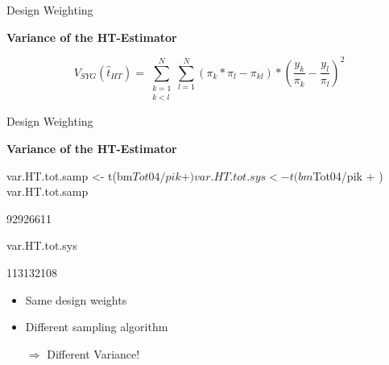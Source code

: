\documentclass[11pt,german,hideothersubsections]{beamer}
\begin{document}
\begin{frame}[fragile]{Design Weighting}
\footnotesize{
\begin{center}
\textbf{Variance of the HT-Estimator}
\end{center}
\begin{equation*}
V_{SYG}(\hat{t}_{HT})=\sum_{\substack{k=1\\ k<l}}^N\sum_{l=1}^N (\pi_k*\pi_l-\pi_{kl})*(\frac{y_k}{\pi_k}-\frac{y_l}{\pi_l})^2
\end{equation*}

\begin{Schunk}
\end{Schunk}
}
\end{frame}
\begin{frame}[fragile]{Design Weighting}
\footnotesize{
\begin{center}
\textbf{Variance of the HT-Estimator}
\end{center}

\begin{Schunk}
\begin{Sinput}
 var.HT.tot.samp <- t(bm$Tot04/pik
+                     )%
 var.HT.tot.sys<- t(bm$Tot04/pik
+                     )%
 var.HT.tot.samp
\end{Sinput}
\begin{Soutput}
         [,1]
[1,] 92926611
\end{Soutput}
\begin{Sinput}
 var.HT.tot.sys
\end{Sinput}
\begin{Soutput}
          [,1]
[1,] 113132108
\end{Soutput}
\end{Schunk}
\begin{itemize}
\pause\item Same design weights
\item Different sampling algorithm
\item[$\Rightarrow$] Different Variance!
\end{itemize}
}
\end{frame}
\end{document}
